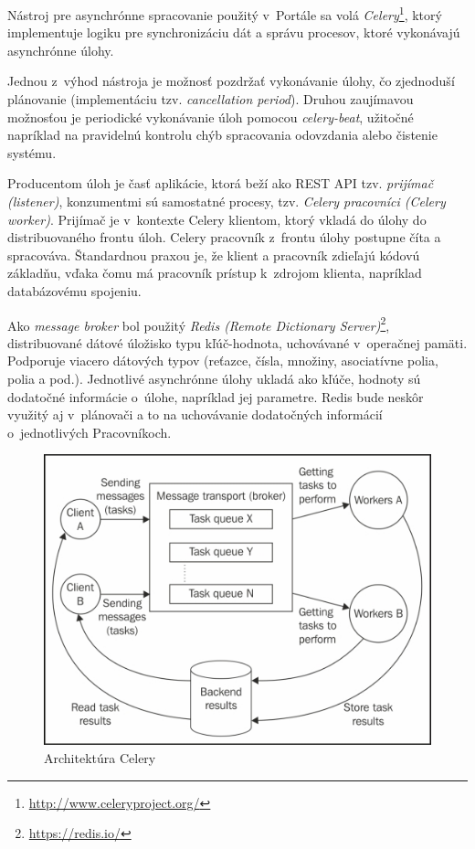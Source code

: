 \documentclass[
  digital, %
  oneside, %
  table,   %
  lof,     %
  lot,   %
]{fithesis3}
\newcommand*{\footurl}[1]{\footnote{\url{#1}}}
\begin{document}
Nástroj pre asynchrónne spracovanie použitý v~Portále sa volá \emph{Celery}\footurl{http://www.celeryproject.org/}, ktorý implementuje logiku pre synchronizáciu dát a správu procesov, ktoré vykonávajú asynchrónne úlohy. 

Jednou z~výhod nástroja je možnosť pozdržať vykonávanie úlohy, čo zjednoduší plánovanie (implementáciu tzv. \emph{cancellation period}). Druhou zaujímavou možnosťou je periodické vykonávanie úloh pomocou \emph{celery-beat}, užitočné napríklad na pravidelnú kontrolu chýb spracovania odovzdania alebo čistenie systému.

Producentom úloh je časť aplikácie, ktorá beží ako REST API tzv. \emph{prijímač (listener)}, konzumentmi sú samostatné procesy, tzv. \emph{Celery pracovníci (Celery worker)}. Prijímač je v~kontexte Celery klientom, ktorý vkladá do úlohy do distribuovaného frontu úloh. Celery pracovník z~frontu úlohy postupne číta a spracováva. Štandardnou praxou je, že klient a pracovník zdieľajú kódovú základňu, vďaka čomu má pracovník prístup k~zdrojom klienta, napríklad databázovému spojeniu\cite{celery-intro}.

Ako \emph{message broker} bol použitý \emph{Redis (Remote Dictionary Server)}\footurl{https://redis.io/}, distribuované dátové úložisko typu kľúč-hodnota, uchovávané v~operačnej pamäti. Podporuje viacero dátových typov (reťazce, čísla, množiny, asociatívne polia, polia a pod.). Jednotlivé asynchrónne úlohy ukladá ako kľúče, hodnoty sú dodatočné informácie o~úlohe, napríklad jej parametre. Redis bude neskôr využitý aj v~plánovači a to na uchovávanie dodatočných informácií o~jednotlivých Pracovníkoch.

\begin{figure}[!ht]
  \begin{center}
    \includegraphics[width=\textwidth]{imgs/celery-arch.jpg}
  \end{center}
    \caption{Architektúra Celery\cite{celery-arch}}
    \label{fig:celery-arch}
\end{figure}
\end{document}
